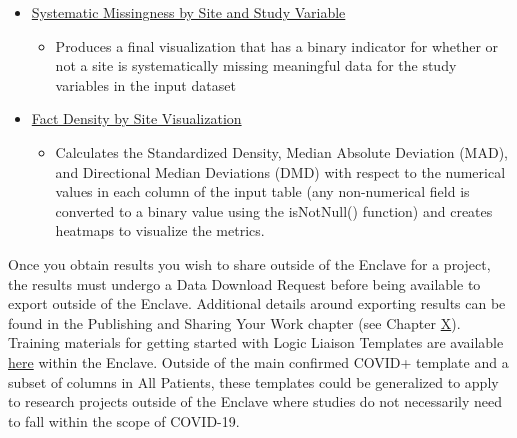 \documentclass[
  letterpaper,
  DIV=11,
  numbers=noendperiod]{scrreprt}
\providecommand{\tightlist}{%
  \setlength{\itemsep}{0pt}\setlength{\parskip}{0pt}}\usepackage{longtable,booktabs,array}
\begin{document}
\begin{itemize}
\tightlist
\item
  \href{https://unite.nih.gov/workspace/module/view/latest/ri.workshop.main.module.3ab34203-d7f3-482e-adbd-f4113bfd1a2b?id=KO-E8BD195\&view=focus}{Systematic
  Missingness by Site and Study Variable}

  \begin{itemize}
  \tightlist
  \item
    Produces a final visualization that has a binary indicator for
    whether or not a site is systematically missing meaningful data for
    the study variables in the input dataset
  \end{itemize}
\item
  \href{https://unite.nih.gov/workspace/module/view/latest/ri.workshop.main.module.3ab34203-d7f3-482e-adbd-f4113bfd1a2b?id=KO-9901C7E\&view=focus}{Fact
  Density by Site Visualization}

  \begin{itemize}
  \tightlist
  \item
    Calculates the Standardized Density, Median Absolute Deviation
    (MAD), and Directional Median Deviations (DMD) with respect to the
    numerical values in each column of the input table (any
    non-numerical field is converted to a binary value using the
    isNotNull() function) and creates heatmaps to visualize the metrics.
  \end{itemize}
\end{itemize}

Once you obtain results you wish to share outside of the Enclave for a
project, the results must undergo a Data Download Request before being
available to export outside of the Enclave. Additional details around
exporting results can be found in the Publishing and Sharing Your Work
chapter (see Chapter
\protect\hyperlink{Publishing-and-Sharing-Your-Work}{X}). Training
materials for getting started with Logic Liaison Templates are available
\href{https://unite.nih.gov/workspace/module/view/latest/ri.workshop.main.module.e7b83a8c-545e-49ac-8714-f34bfa7f7767?view=focus\&Id=26}{here}
within the Enclave. Outside of the main confirmed COVID+ template and a
subset of columns in All Patients, these templates could be generalized
to apply to research projects outside of the Enclave where studies do
not necessarily need to fall within the scope of COVID-19.
\end{document}
